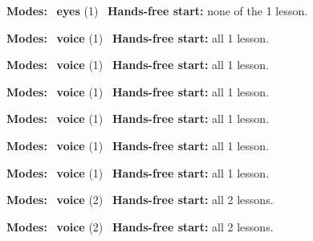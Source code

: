 \expandafter\def\csname hlchaptermodality60\endcsname{%
  {\small\noindent
    \textbf{Modes:} \hlsightsign{}~\textbf{eyes} (1)\quad
    \hlvoicesign{}~\textbf{Hands-free start:} none of the 1 lesson.%
    \par}\medskip
}

\expandafter\def\csname hlchaptermodality61\endcsname{%
  {\small\noindent
    \textbf{Modes:} \hlvoicesign{}~\textbf{voice} (1)\quad
    \hlvoicesign{}~\textbf{Hands-free start:} all 1 lesson.%
    \par}\medskip
}

\expandafter\def\csname hlchaptermodality62\endcsname{%
  {\small\noindent
    \textbf{Modes:} \hlvoicesign{}~\textbf{voice} (1)\quad
    \hlvoicesign{}~\textbf{Hands-free start:} all 1 lesson.%
    \par}\medskip
}

\expandafter\def\csname hlchaptermodality63\endcsname{%
  {\small\noindent
    \textbf{Modes:} \hlvoicesign{}~\textbf{voice} (1)\quad
    \hlvoicesign{}~\textbf{Hands-free start:} all 1 lesson.%
    \par}\medskip
}

\expandafter\def\csname hlchaptermodality64\endcsname{%
  {\small\noindent
    \textbf{Modes:} \hlvoicesign{}~\textbf{voice} (1)\quad
    \hlvoicesign{}~\textbf{Hands-free start:} all 1 lesson.%
    \par}\medskip
}

\expandafter\def\csname hlchaptermodality65\endcsname{%
  {\small\noindent
    \textbf{Modes:} \hlvoicesign{}~\textbf{voice} (1)\quad
    \hlvoicesign{}~\textbf{Hands-free start:} all 1 lesson.%
    \par}\medskip
}

\expandafter\def\csname hlchaptermodality66\endcsname{%
  {\small\noindent
    \textbf{Modes:} \hlvoicesign{}~\textbf{voice} (1)\quad
    \hlvoicesign{}~\textbf{Hands-free start:} all 1 lesson.%
    \par}\medskip
}

\expandafter\def\csname hlchaptermodality67\endcsname{%
  {\small\noindent
    \textbf{Modes:} \hlvoicesign{}~\textbf{voice} (2)\quad
    \hlvoicesign{}~\textbf{Hands-free start:} all 2 lessons.%
    \par}\medskip
}

\expandafter\def\csname hlchaptermodality68\endcsname{%
  {\small\noindent
    \textbf{Modes:} \hlvoicesign{}~\textbf{voice} (2)\quad
    \hlvoicesign{}~\textbf{Hands-free start:} all 2 lessons.%
    \par}\medskip
}

